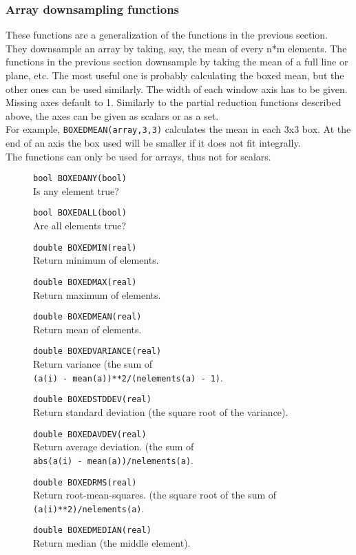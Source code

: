 \subsubsection{Array downsampling functions}
These functions are a generalization of the functions in the previous
section. They downsample an array by taking, say, the mean of every
n*m elements. The functions in the previous section downsample by
taking the mean of a full line or plane, etc.
The most useful one is probably calculating the boxed mean, but
the other ones can be used similarly.
The width of each window axis has to be given. Missing axes default to 1.
Similarly to the partial reduction functions described above, the axes
can be given as scalars or as a set.
\\For example,
\texttt{BOXEDMEAN(array,3,3)} calculates the mean
in each 3x3 box. At the end of an axis the box used will be smaller
if it does not fit integrally.
\\The functions can only be used for arrays, thus not for scalars.
\begin{description}
  \item[] \texttt{bool BOXEDANY(bool)}\\
    Is any element true?
  \item[] \texttt{bool BOXEDALL(bool)}\\
    Are all elements true?
  \item[] \texttt{double BOXEDMIN(real)}\\
    Return minimum of elements.
  \item[] \texttt{double BOXEDMAX(real)}\\
    Return maximum of elements.
  \item[] \texttt{double BOXEDMEAN(real)}\\
    Return mean of elements.
  \item[] \texttt{double BOXEDVARIANCE(real)}\\
    Return variance (the sum of
    \\\texttt{(a(i) - mean(a))**2/(nelements(a) - 1)}.
  \item[] \texttt{double BOXEDSTDDEV(real)}\\
    Return standard deviation (the square root of the variance).
  \item[] \texttt{double BOXEDAVDEV(real)}\\
    Return average deviation. (the sum of 
    \\\texttt{abs(a(i) - mean(a))/nelements(a)}.
  \item[] \texttt{double BOXEDRMS(real)}\\
    Return root-mean-squares. (the square root of the sum of
    \\\texttt{(a(i)**2)/nelements(a)}.
  \item[] \texttt{double BOXEDMEDIAN(real)}\\
    Return median (the middle element).
\end{description}

